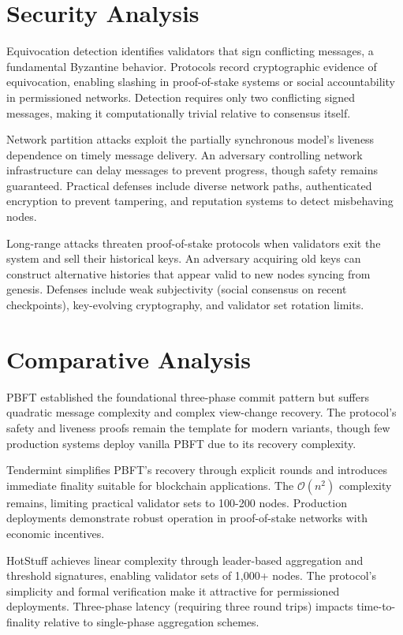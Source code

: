 \documentclass{article}
\begin{document}
\section{Security Analysis}

Equivocation detection identifies validators that sign conflicting messages, a fundamental Byzantine behavior. Protocols record cryptographic evidence of equivocation, enabling slashing in proof-of-stake systems or social accountability in permissioned networks. Detection requires only two conflicting signed messages, making it computationally trivial relative to consensus itself.

Network partition attacks exploit the partially synchronous model's liveness dependence on timely message delivery. An adversary controlling network infrastructure can delay messages to prevent progress, though safety remains guaranteed. Practical defenses include diverse network paths, authenticated encryption to prevent tampering, and reputation systems to detect misbehaving nodes.

Long-range attacks threaten proof-of-stake protocols when validators exit the system and sell their historical keys. An adversary acquiring old keys can construct alternative histories that appear valid to new nodes syncing from genesis. Defenses include weak subjectivity (social consensus on recent checkpoints), key-evolving cryptography, and validator set rotation limits.

\section{Comparative Analysis}

PBFT established the foundational three-phase commit pattern but suffers quadratic message complexity and complex view-change recovery. The protocol's safety and liveness proofs remain the template for modern variants, though few production systems deploy vanilla PBFT due to its recovery complexity.

Tendermint simplifies PBFT's recovery through explicit rounds and introduces immediate finality suitable for blockchain applications. The $\mathcal{O}(n^2)$ complexity remains, limiting practical validator sets to 100-200 nodes. Production deployments demonstrate robust operation in proof-of-stake networks with economic incentives.

HotStuff achieves linear complexity through leader-based aggregation and threshold signatures, enabling validator sets of 1,000+ nodes. The protocol's simplicity and formal verification make it attractive for permissioned deployments. Three-phase latency (requiring three round trips) impacts time-to-finality relative to single-phase aggregation schemes.
\end{document}
